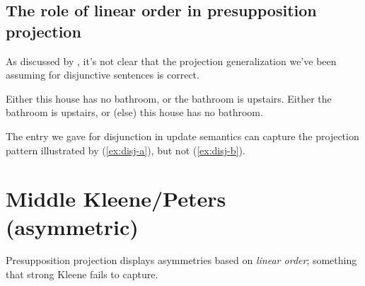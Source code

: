 \documentclass[nols,twoside,nofonts,nobib,nohyper]{tufte-handout}
\theoremstyle{definition}
\begin{document}
    \subsection{The role of linear order in presupposition projection}

    As discussed by \citet{Schlenker2008}, it's not clear that the projection generalization we've been assuming for disjunctive sentences is correct.

    \pex\label{ex:disj}
    \a Either this house has no bathroom, or the bathroom is upstairs.\label{ex:disj-a}
    \a Either the bathroom is upstairs, or (else) this house has no bathroom.\\
    \phantom{,}\hfill\citep[p.\,185]{Schlenker2008}\label{ex:disj-a}
    \xe

    The entry we gave for disjunction in update semantics can capture the projection pattern illustrated by (\ref{ex:disj-a}), but not (\ref{ex:disj-b}).

\section{Middle Kleene/Peters (asymmetric)}

Presupposition projection displays asymmetries based on \textit{linear order}; something that strong Kleene fails to capture.


\printbibliography
\end{document}
